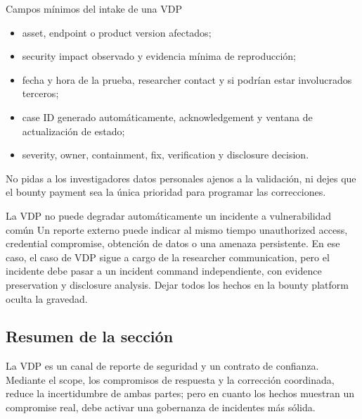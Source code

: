 \begin{importantbox}{Campos mínimos del intake de una VDP}
\begin{itemize}
  \item asset, endpoint o product version afectados;
  \item security impact observado y evidencia mínima de reproducción;
  \item fecha y hora de la prueba, researcher contact y si podrían estar involucrados terceros;
  \item case ID generado automáticamente, acknowledgement y ventana de actualización de estado;
  \item severity, owner, containment, fix, verification y disclosure decision.
\end{itemize}
No pidas a los investigadores datos personales ajenos a la validación, ni dejes que el bounty payment sea la única prioridad para programar las correcciones.
\end{importantbox}


\begin{warningbox}{La VDP no puede degradar automáticamente un incidente a vulnerabilidad común}
Un reporte externo puede indicar al mismo tiempo unauthorized access, credential compromise, obtención de datos o una amenaza persistente. En ese caso, el caso de VDP sigue a cargo de la researcher communication, pero el incidente debe pasar a un incident command independiente, con evidence preservation y disclosure analysis. Dejar todos los hechos en la bounty platform oculta la gravedad.
\end{warningbox}

\subsection{Resumen de la sección}

La VDP es un canal de reporte de seguridad y un contrato de confianza. Mediante el scope, los compromisos de respuesta y la corrección coordinada, reduce la incertidumbre de ambas partes; pero en cuanto los hechos muestran un compromise real, debe activar una gobernanza de incidentes más sólida.
